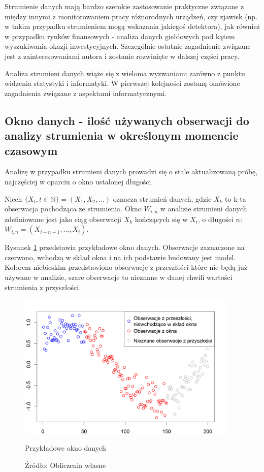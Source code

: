\documentclass[man,mfu]{mgrwms}
\begin{document}
Strumienie danych mają bardzo szerokie zastosowanie praktyczne związane z między innymi z monitorowaniem pracy różnorodnych urządzeń, czy zjawisk (np. w takim przypadku strumieniem mogą wskazania jakiegoś detektora), jak również w przypadku rynków finansowych - analiza danych giełdowych pod kątem wyszukiwania okazji inwestycyjnych. Szczególnie ostatnie zagadnienie związane jest z zainteresowaniami autora i zostanie rozwinięte w dalszej części pracy.

Analiza strumieni danych wiąże się z wieloma wyzwaniami zarówno z punktu widzenia statystyki i informatyki. W pierwszej kolejności zostaną omówione zagadnienia związane z aspektami informatycznymi. 

\subsection{Okno danych - ilość używanych obserwacji do analizy strumienia w określonym momencie czasowym}

Analizę w  przypadku strumieni danych prowadzi się o stale aktualizowaną próbę, najczęściej w oparciu o okno ustalonej długości. 

Niech $\{X_t, t \in \mathbb{N}\} = (X_1,X_2,...)$ oznacza strumień danych, gdzie $X_k$ to k-ta obserwacja pochodząca ze strumienia. Okno $W_{i,n}$ w analizie strumieni danych zdefiniowane jest jako ciąg obserwacji $X_k$ kończących się w $X_i$, o długości $n$: $W_{i,n} = (X_{i-n+1},...,X_i)$.

Rysunek \ref{fig:exwindow} przedstawia przykładowe okno danych. Obserwacje zaznaczone na czerwono, wchodzą w skład okna i na ich podstawie budowany jest model. Kolorem niebieskim przedstawiono obserwacje z przeszłości które nie będą już używane w analizie, szare obserwacje to nieznane w danej chwili wartości strumienia z przyszłości.

\begin{figure}[H]
\centering
\vspace{-10pt}
\includegraphics[width=105mm,height = 70mm]{window}
\caption{Przykładowe okno danych}
\caption*{Źródło: Obliczenia własne}
\label{fig:exwindow}
\end{figure}
\end{document}
